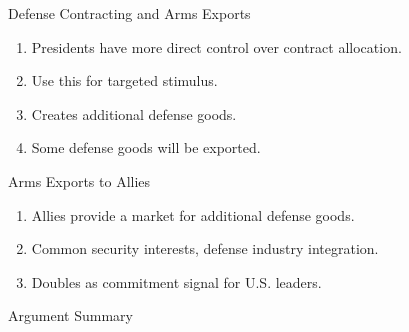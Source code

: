 \documentclass[12pt]{beamer}
\begin{document}
\begin{frame}{Defense Contracting and Arms Exports}

\pause 
\begin{enumerate} 
\item Presidents have more direct control over contract allocation.  
\pause 
\item Use this for targeted stimulus. 
\pause
\item Creates additional defense goods.
\pause
\item Some defense goods will be exported.
\end{enumerate}


\end{frame} 


\begin{frame}{Arms Exports to Allies}

\pause 
\begin{enumerate} 
\item Allies provide a market for additional defense goods.
\pause 
\item Common security interests, defense industry integration. 
\pause
\item Doubles as commitment signal for U.S. leaders. 
\end{enumerate}


\end{frame} 

%
%
%


\begin{frame}{Argument Summary}



\end{frame}
\end{document}

